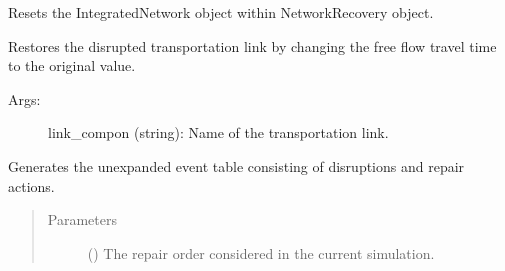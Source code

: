 \documentclass[letterpaper,10pt,english]{sphinxmanual}
\begin{document}
\begin{fulllineitems}
\begin{fulllineitems}
\end{fulllineitems}


\begin{fulllineitems}
\label{\detokenize{apidoc:dreaminsg_integrated_model.src.network_recovery.NetworkRecovery.reset_networks}}
\sphinxAtStartPar
Resets the IntegratedNetwork object within NetworkRecovery object.

\end{fulllineitems}


\begin{fulllineitems}
\label{\detokenize{apidoc:dreaminsg_integrated_model.src.network_recovery.NetworkRecovery.restore_transpo_link}}
\sphinxAtStartPar
Restores the disrupted transportation link by changing the free flow travel time to the original value.
\begin{description}
\item[{Args:}] \leavevmode
\sphinxAtStartPar
link\_compon (string): Name of the transportation link.

\end{description}

\end{fulllineitems}


\begin{fulllineitems}
\label{\detokenize{apidoc:dreaminsg_integrated_model.src.network_recovery.NetworkRecovery.schedule_recovery}}
\sphinxAtStartPar
Generates the unexpanded event table consisting of disruptions and repair actions.
\begin{quote}\begin{description}
\item[{Parameters}] \leavevmode
\sphinxAtStartPar
{} () \textendash{} The repair order considered in the current simulation.


\end{description}
\end{quote}
\end{fulllineitems}
\end{fulllineitems}
\end{document}
